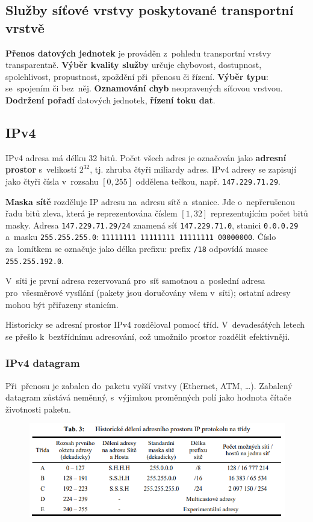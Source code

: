 \subsection{Služby síťové vrstvy poskytované transportní vrstvě}

\textbf{Přenos datových jednotek} je prováděn z~pohledu transportní vrstvy transparentně. \textbf{Výběr kvality služby} určuje chybovost, dostupnost, spolehlivost, propustnost, zpoždění při~přenosu či řízení. \textbf{Výběr typu}: se~spojením či bez~něj. \textbf{Oznamování chyb} neopravených síťovou vrstvou. \textbf{Dodržení pořadí} datových jednotek, \textbf{řízení toku dat}.

\subsection{IPv4}

IPv4 adresa má délku 32 bitů. Počet všech adres je označován jako \textbf{adresní prostor} s~velikostí $2^{32}$, tj. zhruba čtyři miliardy adres. IPv4 adresy se zapisují jako čtyři čísla v~rozsahu $[0, 255]$ oddělena tečkou, např. \texttt{147.229.71.29}.

\textbf{Maska sítě} rozděluje IP adresu na~adresu sítě a~stanice. Jde o~nepřerušenou řadu bitů zleva, která je reprezentována číslem $[1, 32]$ reprezentujícím počet bitů masky. Adresa \texttt{147.229.71.29/24} znamená síť \texttt{147.229.71.0}, stanici \texttt{0.0.0.29} a~masku \texttt{255.255.255.0}: \texttt{11111111 11111111 11111111 00000000}. Číslo za~lomítkem se označuje jako délka prefixu: prefix \texttt{/18} odpovídá masce \texttt{255.255.192.0}.

V~síti je první adresa rezervovaná pro~síť samotnou a~poslední adresa pro~všesměrové vysílání (pakety jsou doručovány všem v~síti); ostatní adresy mohou být přiřazeny stanicím.

Historicky se adresní prostor IPv4 rozděloval pomocí tříd. V~devadesátých letech se přešlo k~beztřídnímu adresování, což umožnilo prostor rozdělit efektivněji.

\subsubsection{IPv4 datagram}

Při~přenosu je zabalen do~paketu vyšší vrstvy (Ethernet, ATM, \dots). Zabalený datagram zůstává neměnný, s~výjimkou proměnných polí jako hodnota čítače životnosti paketu.

\clearpage
\begin{figure}
	\centering
	\includegraphics[width=\textwidth]{images/q07_ip_classes}
\end{figure}

